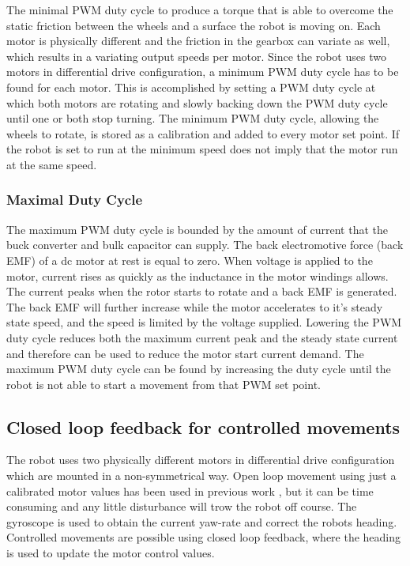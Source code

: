 The minimal PWM duty cycle to produce a torque that is able to overcome the static friction between the wheels and a surface the robot is moving on.
Each motor is physically different and the friction in the gearbox can variate as well, which results in a variating output speeds per motor.
Since the robot uses two motors in differential drive configuration, a minimum PWM duty cycle has to be found for each motor.
This is accomplished by setting a PWM duty cycle at which both motors are rotating and slowly backing down the PWM duty cycle until one or both stop turning.
The minimum PWM duty cycle, allowing the wheels to rotate, is stored as a calibration and added to every motor set point.
If the robot is set to run at the minimum speed does not imply that the motor run at the same speed.

\subsubsection{Maximal Duty Cycle}

The maximum PWM duty cycle is bounded by the amount of current that the buck converter and bulk capacitor can supply.
The back electromotive force (back EMF) of a dc motor at rest is equal to zero.
When voltage is applied to the motor, current rises as quickly as the inductance in the motor windings allows. 
The current peaks when the rotor starts to rotate and a back EMF is generated.
The back EMF will further increase while the motor accelerates to it's steady state speed, and the speed is limited by the voltage supplied.
Lowering the PWM duty cycle reduces both the maximum current peak and the steady state current and therefore can be used to reduce the motor start current demand.
The maximum PWM duty cycle can be found by increasing the duty cycle until the robot is not able to start a movement from that PWM set point. 

\subsection{Closed loop feedback for controlled movements}

The robot uses two physically different motors in differential drive configuration which are mounted in a non-symmetrical way.
Open loop movement using just a calibrated motor values has been used in previous work \cite{legoc_uist_2016}, but it can be time consuming and any little disturbance will trow the robot off course.
The gyroscope is used to obtain the current yaw-rate and correct the robots heading.
Controlled movements are possible using closed loop feedback, where the heading is used to update the motor control values.

